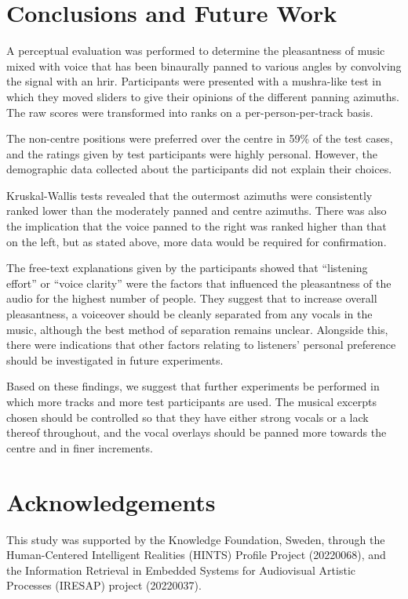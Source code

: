 \documentclass[fleqn]{jaes}
\begin{document}
\section{Conclusions and Future Work}
\label{sec:conclusions}
A perceptual evaluation was performed to determine the pleasantness of music mixed with voice that has been binaurally panned to various angles by convolving the signal with an \gls{hrir}. Participants were presented with a \gls{mushra}-like test in which they moved sliders to give their opinions of the different panning azimuths. The raw scores were transformed into ranks on a per-person-per-track basis.

The non-centre positions were preferred over the centre in 59\% of the test cases, and the ratings given by test participants were highly personal. However, the demographic data collected about the participants did not explain their choices.

Kruskal-Wallis tests revealed that the outermost azimuths were consistently ranked lower than the moderately panned and centre azimuths. There was also the implication that the voice panned to the right was ranked higher than that on the left, but as stated above, more data would be required for confirmation.

The free-text explanations given by the participants showed that \enquote{listening effort} or \enquote{voice clarity} were the factors that influenced the pleasantness of the audio for the highest number of people. They suggest that to increase overall pleasantness, a voiceover should be cleanly separated from any vocals in the music, although the best method of separation remains unclear. Alongside this, there were indications that other factors relating to listeners' personal preference should be investigated in future experiments.

Based on these findings, we suggest that further experiments be performed in which more tracks and more test participants are used. The musical excerpts chosen should be controlled so that they have either strong vocals or a lack thereof throughout, and the vocal overlays should be panned more towards the centre and in finer increments.

\section{Acknowledgements}
This study was supported by the Knowledge Foundation, Sweden, through the Human-Centered Intelligent Realities (HINTS) Profile Project (20220068), and the Information Retrieval in Embedded Systems for Audiovisual Artistic Processes (IRESAP) project (20220037).
\end{document}
